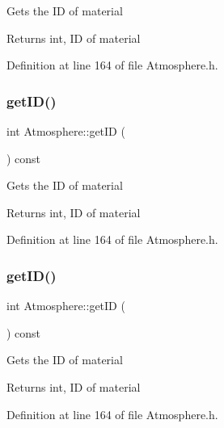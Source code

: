 Gets the ID of material \begin{DoxyReturn}{Returns}
int, ID of material 
\end{DoxyReturn}


Definition at line 164 of file Atmosphere.\+h.

\mbox{\label{class_atmosphere_a73b921f4d29a4a409488cbdb56c53ff7}} 
\subsubsection{\texorpdfstring{get\+I\+D()}{getID()}\hspace{0.1cm}{\footnotesize\ttfamily [2/3]}}
{\footnotesize\ttfamily int Atmosphere\+::get\+ID (\begin{DoxyParamCaption}{ }\end{DoxyParamCaption}) const\hspace{0.3cm}{\ttfamily [inline]}}

Gets the ID of material \begin{DoxyReturn}{Returns}
int, ID of material 
\end{DoxyReturn}


Definition at line 164 of file Atmosphere.\+h.

\mbox{\label{class_atmosphere_a73b921f4d29a4a409488cbdb56c53ff7}} 
\subsubsection{\texorpdfstring{get\+I\+D()}{getID()}\hspace{0.1cm}{\footnotesize\ttfamily [3/3]}}
{\footnotesize\ttfamily int Atmosphere\+::get\+ID (\begin{DoxyParamCaption}{ }\end{DoxyParamCaption}) const\hspace{0.3cm}{\ttfamily [inline]}}

Gets the ID of material \begin{DoxyReturn}{Returns}
int, ID of material 
\end{DoxyReturn}


Definition at line 164 of file Atmosphere.\+h.

\mbox{\label{class_atmosphere_acb944a3a99cd40f0132713ce73e6ca4a}} 
